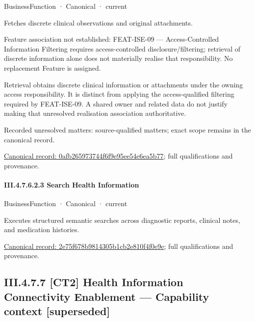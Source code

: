 \label{element:0afb265973744f6f9e95ee54e6ea5b77}
{\small BusinessFunction · Canonical · current}\par

Fetches discrete clinical observations and original attachments.



Feature association not established: FEAT-ISE-09 — Access-Controlled Information Filtering requires access-controlled disclosure/filtering; retrieval of discrete information alone does not materially realise that responsibility. No replacement Feature is assigned.



Retrieval obtains discrete clinical information or attachments under the owning access responsibility. It is distinct from applying the access-qualified filtering required by FEAT-ISE-09. A shared owner and related data do not justify making that unresolved realisation association authoritative.


{\small Recorded unresolved matters: source-qualified matters; exact scope remains in the canonical record.}\par
{\footnotesize \href{../../../../../../../continuum/business/business-function/0afb265973744f6f9e95ee54e6ea5b77.md}{Canonical record: 0afb265973744f6f9e95ee54e6ea5b77}; full qualifications and provenance.}\par
\paragraph*{III.4.7.6.2.3 Search Health Information}
\label{navigation:III.4.7.6.2.3}

\label{element:2e75f678b9814305b1cb2e810f4f0e9e}
{\small BusinessFunction · Canonical · current}\par

Executes structured semantic searches across diagnostic reports, clinical notes, and medication histories.


{\footnotesize \href{../../../../../../../continuum/business/business-function/2e75f678b9814305b1cb2e810f4f0e9e.md}{Canonical record: 2e75f678b9814305b1cb2e810f4f0e9e}; full qualifications and provenance.}\par
\subsection*{III.4.7.7 [CT2] Health Information Connectivity Enablement — Capability context [superseded]}
\label{navigation:III.4.7.7}

